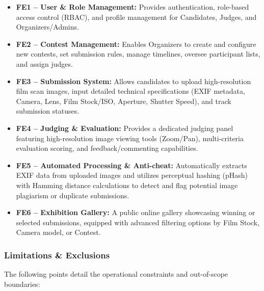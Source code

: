 \begin{itemize}[leftmargin=*, itemsep=0.3em]
    \item \textbf{FE1 – User \& Role Management:} Provides authentication, role-based access control (RBAC), and profile management for Candidates, Judges, and Organizers/Admins.
    \item \textbf{FE2 – Contest Management:} Enables Organizers to create and configure new contests, set submission rules, manage timelines, oversee participant lists, and assign judges.
    \item \textbf{FE3 – Submission System:} Allows candidates to upload high-resolution film scan images, input detailed technical specifications (EXIF metadata, Camera, Lens, Film Stock/ISO, Aperture, Shutter Speed), and track submission statuses.
    \item \textbf{FE4 – Judging \& Evaluation:} Provides a dedicated judging panel featuring high-resolution image viewing tools (Zoom/Pan), multi-criteria evaluation scoring, and feedback/commenting capabilities.
    \item \textbf{FE5 – Automated Processing \& Anti-cheat:} Automatically extracts EXIF data from uploaded images and utilizes perceptual hashing (pHash) with Hamming distance calculations to detect and flag potential image plagiarism or duplicate submissions.
    \item \textbf{FE6 – Exhibition Gallery:} A public online gallery showcasing winning or selected submissions, equipped with advanced filtering options by Film Stock, Camera model, or Contest.
\end{itemize}

\subsubsection{Limitations \& Exclusions}
\label{subsubsec:limitations_exclusions}

The following points detail the operational constraints and out-of-scope boundaries:

